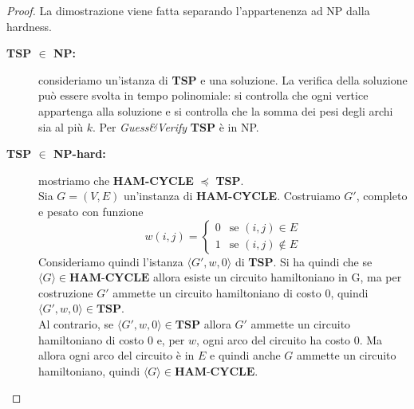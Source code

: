 \begin{proof}
    La dimostrazione viene fatta separando l'appartenenza ad NP dalla hardness.
    \begin{description}
        \item[\textbf{TSP $\in$ NP:}] consideriamo un'istanza di \textbf{TSP} e una soluzione.
                La verifica della soluzione può essere svolta in tempo polinomiale: si controlla che ogni 
                vertice appartenga alla soluzione e si controlla che la somma dei pesi degli archi sia al più $k$.
                Per \textit{Guess\&Verify} \textbf{TSP} è in NP.

        \item[\textbf{TSP $\in$ NP-hard:}] mostriamo che \textbf{HAM-CYCLE} $\preceq$ \textbf{TSP}.\\
                Sia $G=(V,E)$ un'instanza di \textbf{HAM-CYCLE}. Costruiamo $G'$, completo e pesato con funzione 
                $$w(i,j) = \begin{cases}
                            0 & \text{se } (i,j) \in E\\
                            1 & \text{se } (i,j) \notin E
                            \end{cases}$$
                Consideriamo quindi l'istanza $\langle G',w,0\rangle $ di \textbf{ TSP}. Si ha quindi che 
                se $\langle G\rangle \in \textbf{HAM-CYCLE}$ allora esiste un circuito hamiltoniano in G, ma 
                per costruzione $G'$ ammette un circuito hamiltoniano di costo $0$, quindi 
                $\langle G',w,0\rangle \in \textbf{TSP}$.\\
                Al contrario, se $\langle G',w,0\rangle \in \textbf{TSP}$ allora $G'$ ammette un circuito 
                hamiltoniano di costo $0$ e, per $w$, ogni arco del circuito ha costo $0$. Ma allora ogni 
                arco del circuito è in $E$ e quindi anche $G$ ammette un circuito hamiltoniano, quindi 
                $\langle G\rangle \in \textbf{HAM-CYCLE}$.
    \end{description}
\end{proof}
